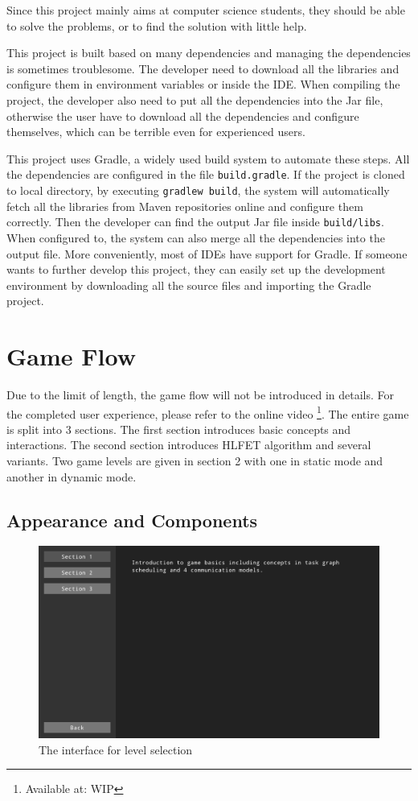 \documentclass[msc,deptreport, cs]{infthesis}
\begin{document}
Since this project mainly aims at computer science students, they should be able to solve the problems, or to find the solution with little help.

This project is built based on many dependencies and managing the dependencies is sometimes troublesome. The developer need to download all the libraries and configure them in environment variables or inside the IDE. When compiling the project, the developer also need to put all the dependencies into the Jar file, otherwise the user have to download all the dependencies and configure themselves, which can be terrible even for experienced users. 

This project uses Gradle, a widely used build system to automate these steps. All the dependencies are configured in the file \verb+build.gradle+. If the project is cloned to local directory, by executing \verb+gradlew build+, the system will automatically fetch all the libraries from Maven repositories online and configure them correctly. Then the developer can find the output Jar file inside \verb+build/libs+. When configured to, the system can also merge all the dependencies into the output file. More conveniently, most of IDEs have support for Gradle. If someone wants to further develop this project, they can easily set up the development environment by downloading all the source files and importing the Gradle project.

\section{Game Flow}

Due to the limit of length, the game flow will not be introduced in details. For the completed user experience, please refer to the online video \footnote{Available at: WIP}. The entire game is split into 3 sections. The first section introduces basic concepts and interactions. The second section introduces HLFET algorithm and several variants. Two game levels are given in section 2 with one in static mode and another in dynamic mode.

\subsection{Appearance and Components}

\begin{figure}[!htb]
  \centering
  \includegraphics[width=\columnwidth]{play2.png}
  \caption{The interface for level selection}
  \label{fig:container}
\end{figure}
\end{document}
